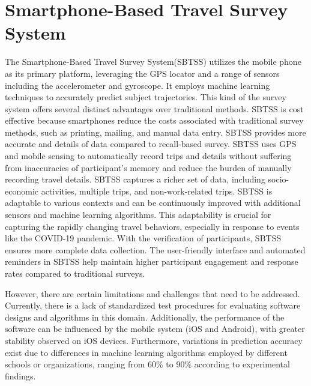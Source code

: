 \documentclass[12pt,two side]{report}
\begin{document}
\section{Smartphone-Based Travel Survey System}
The Smartphone-Based Travel Survey System(SBTSS) utilizes the mobile phone as its primary platform, leveraging the GPS locator and a range of sensors including the accelerometer and gyroscope. It employs machine learning techniques to accurately predict subject trajectories. This kind of the survey system offers several distinct advantages over traditional methods. SBTSS is cost effective because smartphones reduce the costs associated with traditional survey methods, such as printing, mailing, and manual data entry\cite{hong2021insights}. SBTSS provides more accurate and details of data compared to recall-based survey. SBTSS uses GPS and mobile sensing to automatically record trips and details without suffering from inaccuracies of participant's memory and reduce the burden of manually recording travel details\cite{cottrill2013future}\cite{hong2021insights}. SBTSS captures a richer set of data, including socio-economic activities, multiple trips, and non-work-related trips\cite{hong2021insights}\cite{cottrill2013future}.  SBTSS is adaptable to various contexts and can be continuously improved with additional sensors and machine learning algorithms. This adaptability is crucial for capturing the rapidly changing travel behaviors, especially in response to events like the COVID-19 pandemic\cite{hong2021insights}. With the verification of participants, SBTSS ensures more complete data collection\cite{hong2021insights}\cite{cottrill2013future}. The user-friendly interface and automated reminders in SBTSS help maintain higher participant engagement and response rates compared to traditional surveys\cite{hong2021insights}. \newline

However, there are certain limitations and challenges that need to be addressed. Currently, there is a lack of standardized test procedures for evaluating software designs and algorithms in this domain\cite{harding2021we}. Additionally, the performance of the software can be influenced by the mobile system (iOS and Android), with greater stability observed on iOS devices\cite{harding2021we}. Furthermore, variations in prediction accuracy exist due to differences in machine learning algorithms employed by different schools or organizations, ranging from 60\% to 90\% according to experimental findings\cite{harding2021we}.
\end{document}
